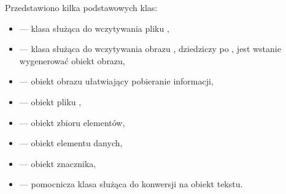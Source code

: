 \gdcmclassExplanations
Przedstawiono kilka podstawowych klas:
\begin{itemize}
    \item {} --- klasa służąca do wczytywania pliku \DICOM,
    \item {} --- klasa służąca do wczytywania obrazu \DICOM, dziedziczy po , jest wstanie wygenerować obiekt obrazu,
    \item {} --- obiekt obrazu ułatwiający pobieranie informacji,
    \item {} --- obiekt pliku \DICOM,
    \item {} --- obiekt zbioru elementów,
    \item {} --- obiekt elementu danych,
    \item {} --- obiekt znacznika,
    \item {} --- pomocnicza klasa służąca do konwersji na obiekt tekstu.
\end{itemize}